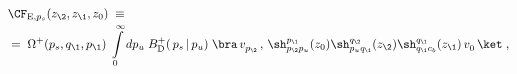 \begin{equation}\label{doublebraid}\begin{aligned}
{}& \CF_{{\rm E},p_s}(z_\2,z_\1,z_0)\;\equiv\;\\[-.5ex]
& =\;\Omega^{+}(p_s,q_\1,p_\1)\;
\int\limits_{0}^{\infty}dp_u\;B_{\rm D}^+(\,p_s\,|\,p_u)
\;\bra\, v_{p_\2}^{}\, ,\,
\sh_{p_\2p_u}^{p_\1}(z_0)
\sh_{p_uq_\1}^{q_\2}(z_\2)
\sh_{q_\1c_b}^{q_\1}(z_\1)\,v_0^{}\,\ket\;,
\end{aligned}\end{equation}

